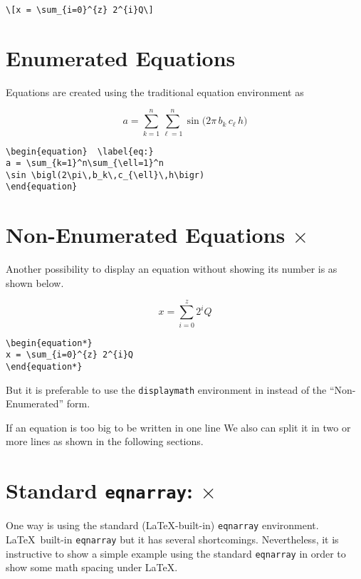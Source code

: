 \documentclass[journal]{IEEEtran}
\begin{document}
\verb!\[x = \sum_{i=0}^{z} 2^{i}Q\]!


\noindent \dotfill
\section{Enumerated Equations}
Equations are created using the traditional equation environment as

\begin{equation} 
a = \sum_{k=1}^n\sum_{\ell=1}^n \sin \bigl(2\pi \, b_k \, c_{\ell} \, h \bigr)
\end{equation}

\begin{verbatim}
\begin{equation}  \label{eq:}
a = \sum_{k=1}^n\sum_{\ell=1}^n
\sin \bigl(2\pi\,b_k\,c_{\ell}\,h\bigr)
\end{equation}
\end{verbatim}

\noindent \dotfill
\section{Non-Enumerated Equations {\color{red} \Large $\mathbf{\times}$}}
Another possibility to display an equation without showing its number is as shown below.

\begin{equation*}
x = \sum_{i=0}^{z} 2^{i}Q 
\end{equation*}

\begin{verbatim}
\begin{equation*}
x = \sum_{i=0}^{z} 2^{i}Q
\end{equation*}
\end{verbatim}

But it is preferable to use the \verb!displaymath! environment in  instead of the ``Non-Enumerated'' form.

If an equation is too big to be written in one line We also can split it in two or more lines as shown in the following sections.

\noindent \dotfill
\section{Standard \texttt{eqnarray}: {\color{red} \Large $\mathbf{\times}$}}
One way is using the standard (\LaTeX-built-in) \texttt{eqnarray} environment. \LaTeX\ built-in \verb!eqnarray! but it has  several shortcomings. Nevertheless, it is instructive to show a simple example using the standard \verb!eqnarray! in order to show some math spacing under \LaTeX. 
\end{document}
